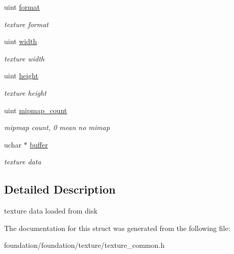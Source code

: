 \begin{DoxyCompactItemize}
\item 
\mbox{\label{structminerva_1_1foundation_1_1texture__data_a9d157ba85b70515de6fce6f93e90c6c9}} 
uint \hyperlink{structminerva_1_1foundation_1_1texture__data_a9d157ba85b70515de6fce6f93e90c6c9}{format}
\begin{DoxyCompactList}\small\item\em texture format \end{DoxyCompactList}\item 
\mbox{\label{structminerva_1_1foundation_1_1texture__data_aa6c5aeb2fdbd76aa859dfffea0ec7274}} 
uint \hyperlink{structminerva_1_1foundation_1_1texture__data_aa6c5aeb2fdbd76aa859dfffea0ec7274}{width}
\begin{DoxyCompactList}\small\item\em texture width \end{DoxyCompactList}\item 
\mbox{\label{structminerva_1_1foundation_1_1texture__data_a44abed30b09fa739f74d16fe66487867}} 
uint \hyperlink{structminerva_1_1foundation_1_1texture__data_a44abed30b09fa739f74d16fe66487867}{height}
\begin{DoxyCompactList}\small\item\em texture height \end{DoxyCompactList}\item 
\mbox{\label{structminerva_1_1foundation_1_1texture__data_aae8415655c566a326cedfaf2795260a8}} 
uint \hyperlink{structminerva_1_1foundation_1_1texture__data_aae8415655c566a326cedfaf2795260a8}{mipmap\+\_\+count}
\begin{DoxyCompactList}\small\item\em mipmap count, 0 mean no mimap \end{DoxyCompactList}\item 
\mbox{\label{structminerva_1_1foundation_1_1texture__data_a04c929b908e1b4cadb0e8a0d7a212e64}} 
uchar $\ast$ \hyperlink{structminerva_1_1foundation_1_1texture__data_a04c929b908e1b4cadb0e8a0d7a212e64}{buffer}
\begin{DoxyCompactList}\small\item\em texture data \end{DoxyCompactList}\end{DoxyCompactItemize}


\subsection{Detailed Description}
texture data loaded from disk 

The documentation for this struct was generated from the following file\+:\begin{DoxyCompactItemize}
\item 
foundation/foundation/texture/texture\+\_\+common.\+h\end{DoxyCompactItemize}
